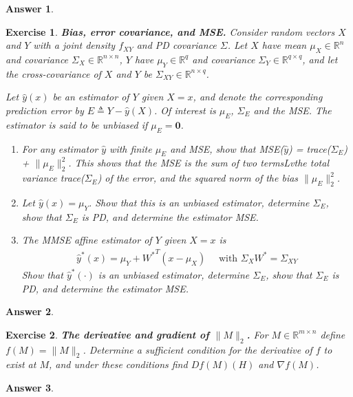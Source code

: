 \documentclass[12pt]{article}
\theoremstyle{colon}
\newtheorem{exercise}{Exercise}
\newtheorem*{answer}{Answer}
\begin{document}
\begin{answer}

\end{answer}

\clearpage

\begin{exercise}
  \textbf{Bias, error covariance, and MSE.} Consider random vectors $X$ and $Y$ with a joint density $f_{XY}$ and PD covariance $\Sigma$. Let $X$ have mean $\mu_X \in \mathbb{R}^n$ and covariance $\Sigma_X \in \mathbb{R}^{n \times n}$, $Y$ have $\mu_Y \in \mathbb{R}^q$ and covariance $\Sigma_Y \in \mathbb{R}^{q \times q}$, and let the cross-covariance of $X$ and $Y$ be $\Sigma_{XY} \in \mathbb{R}^{n \times q}$.

  Let $\hat{y}(x)$ be an estimator of $Y$ given $X = x$, and denote the corresponding prediction error by $E \triangleq Y - \hat{y}(X)$. Of interest is $\mu_E$, $\Sigma_E$ and the MSE. The estimator is said to be \textit{unbiased} if $\mu_E = \bm{0}$.

  \begin{enumerate}[label=\alph*)]
    \item For any estimator $\hat{y}$ with finite $\mu_E$ and MSE, show that MSE($\hat{y}$) = trace($\Sigma_E$) + $\lVert \mu_E \rVert_2^2$. This shows that the MSE is the sum of two termsLvthe total variance trace($\Sigma_E$) of the error, and the squared norm of the bias $\lVert \mu_E \rVert_2^2$.

    \item Let $\hat{y}(x) = \mu_Y$. Show that this is an unbiased estimator, determine $\Sigma_E$, show that $\Sigma_E$ is PD, and determine the estimator MSE.

    \item The MMSE affine estimator of $Y$ given $X = x$ is
      \begin{gather*}
        \hat{y}^*(x) = \mu_Y + {W^*}^T (x - \mu_X) \quad \text{ with } \Sigma_X W^* = \Sigma_{XY}
      \end{gather*}
      Show that $\hat{y}^*(\cdot)$ is an unbiased estimator, determine $\Sigma_E$, show that $\Sigma_E$ is PD, and determine the estimator MSE.
  \end{enumerate}
\end{exercise}

\begin{answer}

\end{answer}

\clearpage

\begin{exercise}
  \textbf{The derivative and gradient of $\lVert M \rVert_2$.} For $M \in \mathbb{R}^{m \times n}$ define $f(M) = \lVert M \rVert_2$. Determine a sufficient condition for the derivative of $f$ to exist at $M$, and under these conditions find $D f(M)(H)$ and $\nabla f(M)$.
\end{exercise}

\begin{answer}

\end{answer}
\end{document}
